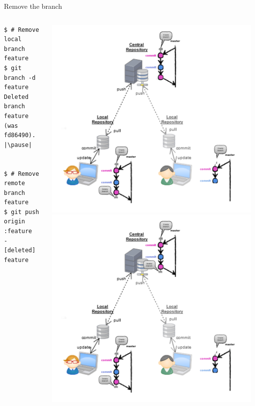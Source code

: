 \begin{frame}[fragile]{Remove the branch}
\begin{columns}
	\begin{column}{0.4\textwidth}
  	\begin{lstlisting}
$ # Remove local branch feature
$ git branch -d feature
Deleted branch feature (was fd86490). |\pause|


$ # Remove remote branch feature
$ git push origin :feature
- [deleted] feature
	\end{lstlisting}
	\end{column}
	\begin{column}{0.6\textwidth}
		\begin{center}
			 {
				\includegraphics[width=.9\textwidth]{multiuser_my_delete.png}
			}\only<2> {
				\includegraphics[width=.9\textwidth]{multiuser_remote_delete.png}
			}
		\end{center}
	\end{column}
\end{columns}
\end{frame}

